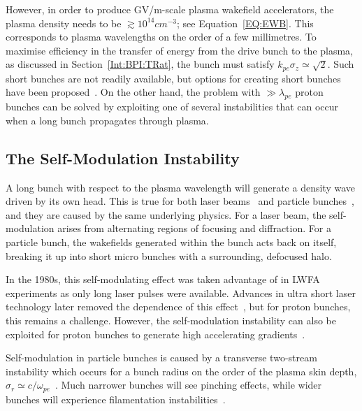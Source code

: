However, in order to produce GV/m-scale plasma wakefield accelerators, the plasma density needs to be $\gtrsim 10^{14}\unit{cm}^{-3}$; see Equation~\ref{EQ:EWB}.
This corresponds to plasma wavelengths on the order of a few millimetres.
To maximise efficiency in the transfer of energy from the drive bunch to the plasma, as discussed in Section~\ref{Int:BPI:TRat}, the bunch must satisfy $k_{pe}\sigma_{z} \simeq \sqrt{2}$.
Such short bunches are not readily available, but options for creating short bunches have been proposed~\cite{assmann:2009}.
On the other hand, the problem with $\gg\lambda_{pe}$ proton bunches can be solved by exploiting one of several instabilities that can occur when a long bunch propagates through plasma.

\subsection{The Self-Modulation Instability}
\label{Int:DBeam:SMI}

A long bunch with respect to the plasma wavelength will generate a density wave driven by its own head.
This is true for both laser beams~\cite{esarey:1994} and particle bunches~\cite{kumar:2010}, and they are caused by the same underlying physics.
For a laser beam, the self-modulation arises from alternating regions of focusing and diffraction.
For a particle bunch, the wakefields generated within the bunch acts back on itself, breaking it up into short micro bunches with a surrounding, defocused halo.

In the 1980s, this self-modulating effect was taken advantage of in LWFA experiments as only long laser pulses were available.
Advances in ultra short laser technology later removed the dependence of this effect~\cite{pukhov:2002}, but for proton bunches, this remains a challenge.
However, the self-modulation instability can also be exploited for proton bunches to generate high accelerating gradients~\cite{schroeder:2012,schroeder:2011,caldwell:2009}.

Self-modulation in particle bunches is caused by a transverse two-stream instability which occurs for a bunch radius on the order of the plasma skin depth, $\sigma_{r} \simeq c/\omega_{pe}$~\cite{vieira:2012}.
Much narrower bunches will see pinching effects, while wider bunches will experience filamentation instabilities~\cite{keinigs:1987}.

